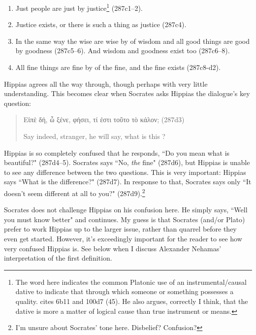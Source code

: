 \documentclass[11pt]{article}
\begin{document}
\begin{enumerate}
    \item Just people are just by justice\footnote{The word  here indicates the common Platonic use of an instrumental/causal dative to indicate that through which someone or something possesses a quality. \citet{woodruff1982} cites  6b11 and  100d7 (45).  He also argues, correctly I think, that the dative is more a matter of logical cause than true instrument or means.} (287c1--2).
    \item Justice exists, or there is such a thing as justice (287c4).
    \item In the same way the wise are wise by of wisdom and all good things are good by goodness (287c5--6).  And wisdom and goodness exist too (287c6--8).
    \item All fine things are fine by of the fine, and the fine exists (287c8-d2).
\end{enumerate}

Hippias agrees all the way through, though perhaps with very little understanding.  This becomes clear when Socrates asks Hippias the dialogue's key question:

\begin{quote}
    Εἰπὲ δή, ὦ ξένε, φήσει, τί ἐστι τοῦτο τὸ κάλον; (287d3)

    Say indeed, stranger, he will say, what is this ?
\end{quote}

Hippias is so completely confused that he responds, ``Do you mean what is beautiful?" (287d4--5).  Socrates says ``No, \emph{the} fine" (287d6), but Hippias is unable to see any difference between the two questions.  This is very important: Hippias says ``What is the difference?" (287d7).  In response to that, Socrates says only ``It doesn't seem different at all to you?" (287d9).\footnote{I'm unsure about Socrates' tone here.  Disbelief?  Confusion?}

Socrates does not challenge Hippias on his confusion here.  He simply says, ``Well you must know better" and continues.  My guess is that Socrates (and/or Plato) prefer to work Hippias up to the larger issue, rather than quarrel before they even get started.  However, it's exceedingly important for the reader to see how very confused Hippias is.  See below when I discuss Alexander Nehamas' interpretation of the first definition.
\end{document}
